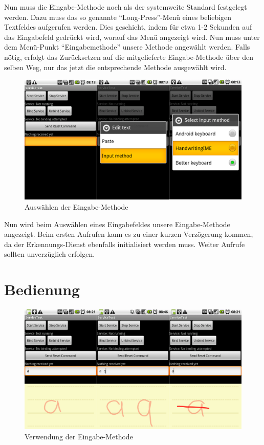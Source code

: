 Nun muss die Eingabe-Methode noch als der systemweite Standard festgelegt werden. Dazu muss das so genannte ``Long-Press''-Menü eines beliebigen Textfeldes aufgerufen werden. Dies geschieht, indem für etwa 1-2 Sekunden auf das Eingabefeld gedrückt wird, worauf das Menü angezeigt wird. Nun muss unter dem Menü-Punkt ``Eingabemethode'' unsere Methode angewählt werden. Falls nötig, erfolgt das Zurücksetzen auf die mitgelieferte Eingabe-Methode über den selben Weg, nur das jetzt die entsprechende Methode ausgewählt wird.

\begin{figure}[h!]
   \centering
   \includegraphics[scale=0.15]{img/manual_ime_select} 
   \caption{Auswählen der Eingabe-Methode}
   \label{fig:manual_ime_select}
\end{figure}

Nun wird beim Auswählen eines Eingabefeldes unsere Eingabe-Methode angezeigt. Beim ersten Aufrufen kann es zu einer kurzen Verzögerung kommen, da der Erkennungs-Dienst ebenfalls initialisiert werden muss. Weiter Aufrufe sollten unverzüglich erfolgen.

\section{Bedienung}

\begin{figure}[h!]
   \centering
   \includegraphics[width=\textwidth]{img/manual_input} 
   \caption{Verwendung der Eingabe-Methode}
   \label{fig:manul_input}
\end{figure}

